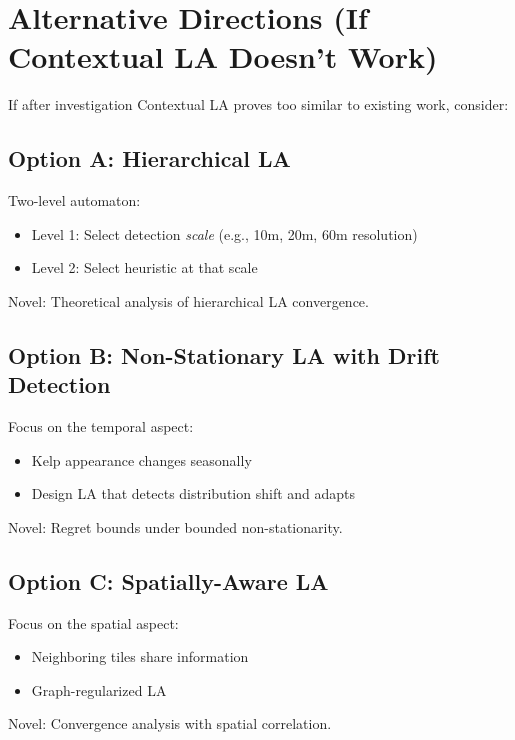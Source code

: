 \documentclass[11pt]{article}
\begin{document}
\section{Alternative Directions (If Contextual LA Doesn't Work)}

If after investigation Contextual LA proves too similar to existing work, consider:

\subsection{Option A: Hierarchical LA}

Two-level automaton:
\begin{itemize}
  \item Level 1: Select detection \textit{scale} (e.g., 10m, 20m, 60m resolution)
  \item Level 2: Select heuristic at that scale
\end{itemize}

Novel: Theoretical analysis of hierarchical LA convergence.

\subsection{Option B: Non-Stationary LA with Drift Detection}

Focus on the temporal aspect:
\begin{itemize}
  \item Kelp appearance changes seasonally
  \item Design LA that detects distribution shift and adapts
\end{itemize}

Novel: Regret bounds under bounded non-stationarity.

\subsection{Option C: Spatially-Aware LA}

Focus on the spatial aspect:
\begin{itemize}
  \item Neighboring tiles share information
  \item Graph-regularized LA
\end{itemize}

Novel: Convergence analysis with spatial correlation.
\end{document}
